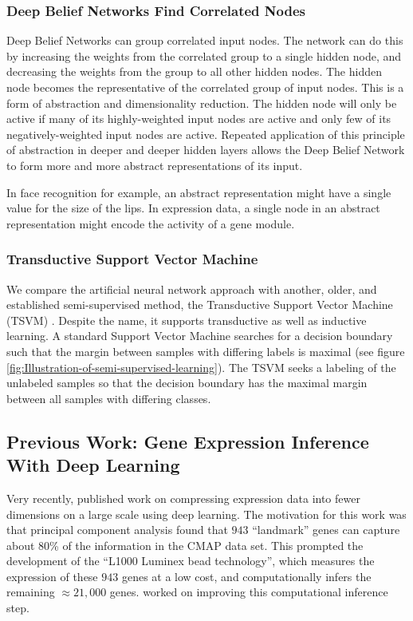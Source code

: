 \subsubsection{Deep Belief Networks Find Correlated Nodes}

Deep Belief Networks can group correlated input nodes. The network
can do this by increasing the weights from the correlated group to
a single hidden node, and decreasing the weights from the group to
all other hidden nodes. The hidden node becomes the representative
of the correlated group of input nodes. This is a form of abstraction
and dimensionality reduction. The hidden node will only be active
if many of its highly-weighted input nodes are active and only few
of its negatively-weighted input nodes are active. Repeated application
of this principle of abstraction in deeper and deeper hidden layers
allows the Deep Belief Network to form more and more abstract representations
of its input.

In face recognition for example, an abstract representation might
have a single value for the size of the lips. In expression data,
a single node in an abstract representation might encode the activity
of a gene module.

\subsubsection{Transductive Support Vector Machine}

We compare the artificial neural network approach with another, older,
and established semi-supervised method, the Transductive Support Vector
Machine (TSVM) \cite{Joachims1999}. Despite the name, it supports
transductive as well as inductive learning. A standard Support Vector
Machine searches for a decision boundary such that the margin between
samples with differing labels is maximal (see figure \ref{fig:Illustration-of-semi-supervised-learning}).
The TSVM seeks a labeling of the unlabeled samples so that the decision
boundary has the maximal margin between all samples with differing
classes. 

\subsection{Previous Work: Gene Expression Inference With Deep Learning\label{subsec:Previous-Work:Gene-Expression-Inference-with-Deep-Learning}}

Very recently, \cite{ChenXie2015} published work on compressing expression
data into fewer dimensions on a large scale using deep learning. The
motivation for this work was that principal component analysis found
that $943$ ``landmark'' genes can capture about 80\% of the information
in the CMAP data set. This prompted the development of the ``L1000
Luminex bead technology'', which measures the expression of these
$943$ genes at a low cost, and computationally infers the remaining
$\approx21,000$ genes. \cite{ChenXie2015} worked on improving this
computational inference step.

